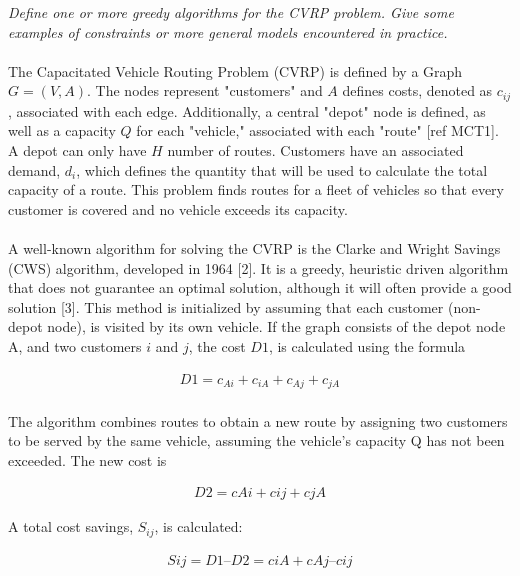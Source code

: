 \documentclass[12pt]{article}
\begin{document}
\textit{Define one or more greedy algorithms for the CVRP problem. Give some examples of constraints or more general models encountered in practice.}
\paragraph{}
The Capacitated Vehicle Routing Problem (CVRP) is defined by a Graph $G = (V, A)$. The nodes represent "customers" and $A$ defines costs, denoted as $c_{ij}$, associated with each edge. Additionally, a central "depot" node is defined, as well as a capacity $Q$ for each "vehicle," associated with each "route" [ref MCT1]. A depot can only have $H$ number of routes. Customers have an associated demand, $d_i$, which defines the quantity that will be used to calculate the total capacity of a route. This problem finds routes for a fleet of vehicles so that every customer is covered and no vehicle exceeds its capacity.
\paragraph{}
A well-known algorithm for solving the CVRP is the Clarke and Wright Savings (CWS) algorithm, developed in 1964 [2]. It is a greedy, heuristic driven algorithm that does not guarantee an optimal solution, although it will often provide a good solution [3]. This method is initialized by assuming that each customer (non-depot node), is visited by its own vehicle. If the graph consists of the depot node A, and two customers $i$ and $j$, the cost $D1$, is calculated using the formula

\begin{align*}
D1 = c_{Ai} + c_{iA} + c_{Aj} + c_{jA}
\end{align*}

\paragraph{}
The algorithm combines routes to obtain a new route by assigning two customers to be served by the same vehicle, assuming the vehicle's capacity Q has not been exceeded. The new cost is

\begin{align*}
D2 = cAi + cij + cjA
\end{align*}

A total cost savings, $S_{ij}$, is calculated:

\begin{align*}
Sij = D1 – D2 = ciA + c Aj – cij
\end{align*}
\end{document}
